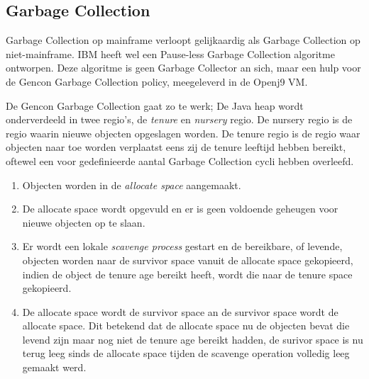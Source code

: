 \subsection{Garbage Collection}
\label{sec:mainframe garbage collection}
Garbage Collection op mainframe verloopt gelijkaardig als Garbage Collection op niet-mainframe.
IBM heeft wel een Pause-less Garbage Collection algoritme ontworpen.
Deze algoritme is geen Garbage Collector an sich, maar een hulp voor de Gencon Garbage Collection policy, meegeleverd in de Openj9 VM.


De Gencon Garbage Collection gaat zo te werk;
De Java heap wordt onderverdeeld in twee regio's, de \textit{tenure} en \textit{nursery} regio.
De nursery regio is de regio waarin nieuwe objecten opgeslagen worden.
De tenure regio is de regio waar objecten naar toe worden verplaatst eens zij de tenure leeftijd hebben bereikt, oftewel een voor gedefinieerde aantal Garbage Collection cycli hebben overleefd. 

\begin{enumerate}
    \item Objecten worden in de \textit{allocate space} aangemaakt.
    \item De allocate space wordt opgevuld en er is geen voldoende geheugen voor nieuwe objecten op te slaan.
    \item Er wordt een lokale \textit{scavenge process} gestart en de bereikbare, of levende, objecten worden naar de survivor space vanuit de allocate space gekopieerd, indien de object de tenure age bereikt heeft, wordt die naar de tenure space gekopieerd.
    \item De allocate space wordt de survivor space an de survivor space wordt de allocate space.
     Dit betekend dat de allocate space nu de objecten bevat die levend zijn maar nog niet de tenure age bereikt hadden,
     de surivor space is nu terug leeg sinds de allocate space tijden de scavenge operation volledig leeg gemaakt werd.
\end{enumerate}

